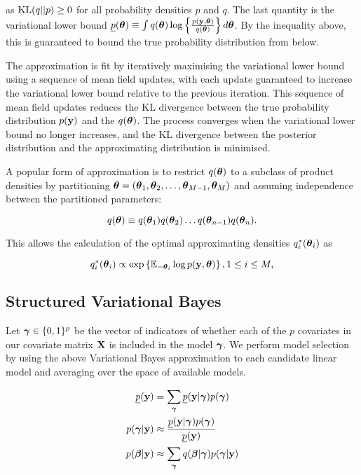 \documentclass{amsart}[12pt]
\begin{document}
as $\text{KL}(q||p) \geq 0$ for all probability densities $p$ and $q$. The last quantity is the variational lower
bound $\underline{p}({\boldsymbol \theta}) \equiv \int q({\boldsymbol \theta}) \log\left\{ \frac{p({\bf y}, {\boldsymbol \theta})}{q({\boldsymbol \theta})} \right\}
d{\boldsymbol \theta}$. By the inequality above, this is guaranteed to bound the true probability distribution from
below.

The approximation is fit by iteratively maximising the variational lower bound using a sequence of mean field
updates, with each update guaranteed to increase the variational lower bound relative to the previous
iteration. This sequence of mean field updates reduces the KL divergence between the true probability
distribution $p({\bf y})$ and the $q({\boldsymbol \theta})$. The process converges when the variational lower bound no longer
increases, and the KL divergence between the posterior distribution and the approximating distribution is
minimised.

A popular form of approximation is to restrict $q({\boldsymbol \theta})$ to a subclass of product densities by partitioning
${\boldsymbol \theta} = ({\boldsymbol \theta}_1, {\boldsymbol \theta}_2, \ldots, {\boldsymbol \theta}_{M-1}, {\boldsymbol \theta}_M)$ and assuming independence between the
partitioned parameters:

\begin{equation*}
q({\boldsymbol \theta}) \equiv q({\boldsymbol \theta}_1) q({\boldsymbol \theta}_2) \ldots q({\boldsymbol \theta}_{n-1}) q({\boldsymbol \theta}_n).
\end{equation*}

This allows the calculation of the optimal approximating densities $q_i^*({\boldsymbol \theta}_i)$ as

\begin{equation*}
q_i^*({\boldsymbol \theta}_i) \propto \exp \left \{ \mathbb{E}_{-{\boldsymbol \theta}_i} \log p({\bf y}, {\boldsymbol \theta}) \right \}, 1 \leq i \leq M,
\end{equation*}

\subsection{Structured Variational Bayes}

Let ${\boldsymbol \gamma} \in \{0, 1\}^p$ be the vector of indicators of whether each of the $p$ covariates in our
covariate matrix ${\bf X}$ is included in the model ${\boldsymbol \gamma}$. We perform model selection by using the above
Variational Bayes approximation to each  candidate linear model and averaging over the space of available
models.

\begin{align*}
\underline{p}({\bf y}) &= \sum_{\boldsymbol \gamma} \underline{p}({\bf y}|{\boldsymbol \gamma}) p({\boldsymbol \gamma}) \\
p({\boldsymbol \gamma}|{\bf y}) &\approx \frac{\underline{p}({\bf y}|{\boldsymbol \gamma}) p({\boldsymbol \gamma})}{\underline{p}({\bf y})} \\
p({\boldsymbol \beta}|{\bf y}) &\approx \sum_{\boldsymbol \gamma} q({\boldsymbol \beta}|{\boldsymbol \gamma}) p({\boldsymbol \gamma}|{\bf y}) \\
\end{align*}
\end{document}
